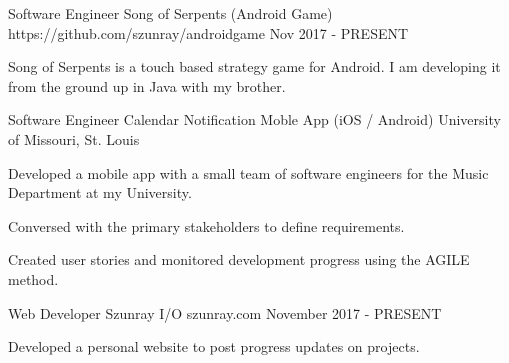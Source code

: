 

\vspace{-1mm}

\begin{cventries}


\cventry
{Software Engineer} %
{Song of Serpents (Android Game)} %
{https://github.com/szunray/androidgame} %
{Nov 2017 - PRESENT} %
{ %
\begin{cvitems}
\item {Song of Serpents is a touch based strategy game for Android. I am developing it from the ground up in Java with my brother. }
\end{cvitems}
}


\cventry
{Software Engineer} %
{Calendar Notification Moble App (iOS / Android)} %
{University of Missouri, St. Louis} %
{} %
{ %
\begin{cvitems}
\item {Developed a mobile app with a small team of software engineers for the Music Department at my University.} 
\item {Conversed with the primary stakeholders to define requirements.} 
\item {Created user stories and monitored development progress using the AGILE method.} 
\end{cvitems}
}


\cventry
{Web Developer} %
{Szunray I/O} %
{szunray.com} %
{November 2017 - PRESENT} %
{ %
\begin{cvitems}
\item {Developed a personal website to post progress updates on projects.} 
\end{cvitems}
}


\end{cventries}
